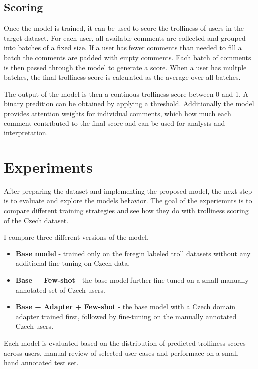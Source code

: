 \documentclass[twoside]{ctuthesis}
\theoremstyle{plain}
\theoremstyle{definition}
\theoremstyle{note}
\begin{document}
\section{Scoring}
Once the model is trained, it can be used to score the trolliness of users in the target dataset. For each user, all available comments are collected and grouped into batches of a fixed size. If a user has fewer comments than needed to fill a batch the comments are padded with empty comments. Each batch of comments is then passed through the model to generate a score. When a user has multple batches, the final trolliness score is calculated as the average over all batches.\par
The output of the model is then a continous trolliness score between 0 and 1. A binary predition can be obtained by applying a threshold. Additionally the model provides attention weights for individual comments, which how much each comment contributed to the final score and can be used for analysis and interpretation.\par


\chapter{Experiments}

After preparing the dataset and implementing the proposed model, the next step is to evaluate and explore the models behavior. The goal of the experiemnts is to compare different training strategies and see how they do with trolliness scoring of the Czech dataset.\par
I compare three different versions of the model. 
\begin{itemize} 
	\item \textbf{Base model} - trained only on the foregin labeled troll datasets without any additional fine-tuning on Czech data. 
	\item \textbf{Base + Few-shot} - the base model further fine-tuned on a small manually annotated set of Czech users. 
	\item \textbf{Base + Adapter + Few-shot} - the base model with a Czech domain adapter trained first, followed by fine-tuning on the manually annotated Czech users. 
\end{itemize}
Each model is evaluated based on the distribution of predicted trolliness scores across users, manual review of selected user cases and performace on a small hand annotated test set.
\end{document}
